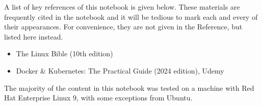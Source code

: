 A list of key references of this notebook is given below. These materials are frequently cited in the notebook and it will be tedious to mark each and every of their appearances. For convenience, they are not given in the Reference, but listed here instead.

\begin{itemize}
	\item The Linux Bible (10th edition)
	\item Docker \& Kubernetes: The Practical Guide (2024 edition), Udemy
\end{itemize}
 
 The majority of the content in this notebook was tested on a machine with Red Hat Enterprise Linux 9, with some exceptions from Ubuntu. 